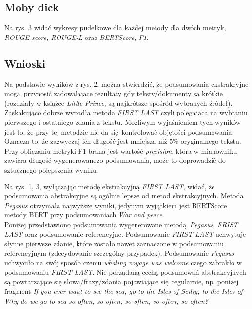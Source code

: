 \documentclass{article}
\begin{document}
\subsection{Moby dick}
Na rys. 3 widać wykresy pudełkowe dla każdej metody dla dwóch metryk, \textit{ROUGE score, ROUGE-L} oraz 
\textit{BERTScore, F1}.

\subsection{Wnioski}
Na podstawie wyników z rys. 2, można stwierdzić, że podsumowania ekstrakcyjne
mogą przynosić zadowalające rezultaty gdy teksty/dokumenty są krótkie (rozdziały w 
książce \textit{Little Prince}, są najkrótsze spośród wybranych źródeł). \\

Zaskakująco dobrze wypadła metoda \textit{FIRST LAST} czyli polegająca na wybraniu
pierwszego i ostatniego zdania z tekstu. Możliwym wyjaśnieniem tych wyników
jest to, że przy tej metodzie nie da się kontrolować objętości podsumowania. Oznacza
to, że zazwyczaj ich długość jest mniejsza niż 5\% oryginalnego tekstu. Przy obliczaniu
metryki F1 brana jest wartość \textit{precision}, która w mianowniku zawiera 
długość wygenerowanego podsumowania, może to doprowadzić do sztucznego polepszenia wyniku.

Na rys. 1, 3, wyłączając metodę ekstrakcyjną \textit{FIRST LAST}, widać, że podsumowania 
abstrakcyjne są ogólnie lepsze od metod ekstrakcyjnych.
Metoda \textit{Pegasus} otrzymała
najwyższe wyniki, jedynym wyjątkiem jest BERTScore metody BERT przy podsumowaniach 
\textit{War and peace}.\\

Poniżej przedstawiono podsumowania wygenerowane metodą \textit{Pegasus}, \textit{FRIST LAST} oraz
podsumowanie referencyjne. Podsumowanie \textit{FIRST LAST} uchwytuje słynne pierwsze zdanie,
które zostało nawet zaznaczone w podsumowaniu referencyjnym (zdecydowanie szczególny przypadek).
Podsumowanie \textit{Pegasus} uchwyciło na swój sposób czemu \textit{whaling voyage was welcome}
czego zabrakło w podsumowaniu \textit{FIRST LAST}. Nie porządaną cechą podsumowań abstrakcyjnych 
są powtarzające się słowa/frazy/zdania pojawiające się regularnie, np. poniżej fragment
\textit{If you ever want to see the sea, go to the Isles of Scilly, to the Isles of Why do we go
to sea so often, so often, so often, so often, so often?}
\end{document}
